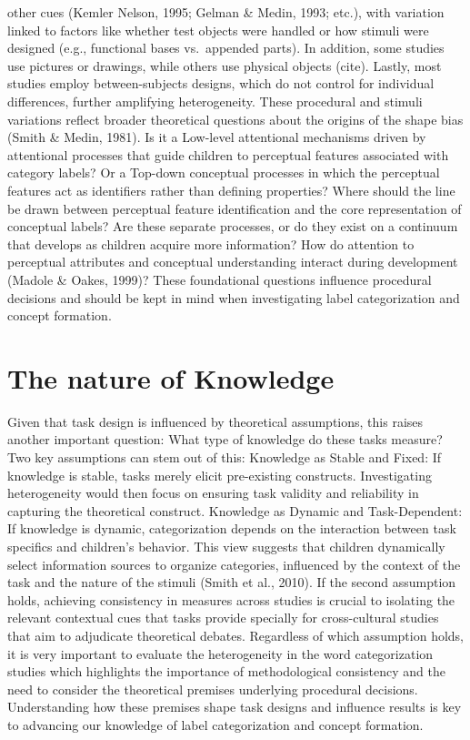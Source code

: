 \documentclass[10pt, letterpaper]{article}
\begin{document}
other cues (Kemler Nelson, 1995; Gelman \& Medin, 1993; etc.), with
variation linked to factors like whether test objects were handled or
how stimuli were designed (e.g., functional bases vs.~appended parts).
In addition, some studies use pictures or drawings, while others use
physical objects (cite). Lastly, most studies employ between-subjects
designs, which do not control for individual differences, further
amplifying heterogeneity. These procedural and stimuli variations
reflect broader theoretical questions about the origins of the shape
bias (Smith \& Medin, 1981). Is it a Low-level attentional mechanisms
driven by attentional processes that guide children to perceptual
features associated with category labels? Or a Top-down conceptual
processes in which the perceptual features act as identifiers rather
than defining properties? Where should the line be drawn between
perceptual feature identification and the core representation of
conceptual labels? Are these separate processes, or do they exist on a
continuum that develops as children acquire more information? How do
attention to perceptual attributes and conceptual understanding interact
during development (Madole \& Oakes, 1999)? These foundational questions
influence procedural decisions and should be kept in mind when
investigating label categorization and concept formation.

\hypertarget{the-nature-of-knowledge}{%
\section{The nature of Knowledge}\label{the-nature-of-knowledge}}

Given that task design is influenced by theoretical assumptions, this
raises another important question: What type of knowledge do these tasks
measure? Two key assumptions can stem out of this: Knowledge as Stable
and Fixed: If knowledge is stable, tasks merely elicit pre-existing
constructs. Investigating heterogeneity would then focus on ensuring
task validity and reliability in capturing the theoretical construct.
Knowledge as Dynamic and Task-Dependent: If knowledge is dynamic,
categorization depends on the interaction between task specifics and
children's behavior. This view suggests that children dynamically select
information sources to organize categories, influenced by the context of
the task and the nature of the stimuli (Smith et al., 2010). If the
second assumption holds, achieving consistency in measures across
studies is crucial to isolating the relevant contextual cues that tasks
provide specially for cross-cultural studies that aim to adjudicate
theoretical debates. Regardless of which assumption holds, it is very
important to evaluate the heterogeneity in the word categorization
studies which highlights the importance of methodological consistency
and the need to consider the theoretical premises underlying procedural
decisions. Understanding how these premises shape task designs and
influence results is key to advancing our knowledge of label
categorization and concept formation.
\end{document}
